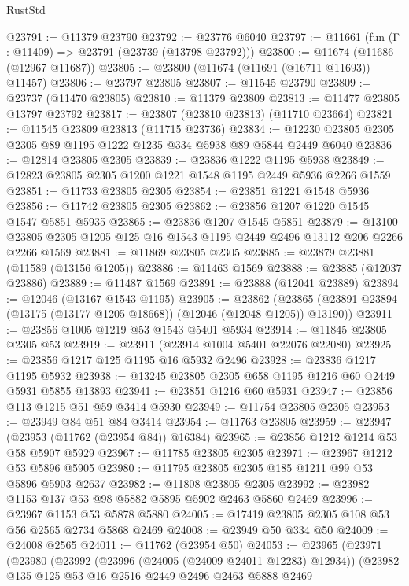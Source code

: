 \begin{lexlean}{RustStd}
\begin{coremodule}
@23791 := @11379 @23790
@23792 := @23776 @6040
@23797 := @11661 (fun (Γ : @11409) => @23791 (@23739 (@13798 @23792)))
@23800 := @11674 (@11686 (@12967 @11687))
@23805 := @23800 (@11674 (@11691 (@16711 @11693)) @11457)
@23806 := @23797 @23805
@23807 := @11545 @23790
@23809 := @23737 (@11470 @23805)
@23810 := @11379 @23809
@23813 := @11477 @23805 @13797 @23792
@23817 := @23807 (@23810 @23813) (@11710 @23664)
@23821 := @11545 @23809 @23813 (@11715 @23736)
@23834 := @12230 @23805 @2305 @2305 @89 @1195 @1222 @1235 @334 @5938 @89 @5844 @2449 @6040
@23836 := @12814 @23805 @2305
@23839 := @23836 @1222 @1195 @5938
@23849 := @12823 @23805 @2305 @1200 @1221 @1548 @1195 @2449 @5936 @2266 @1559
@23851 := @11733 @23805 @2305
@23854 := @23851 @1221 @1548 @5936
@23856 := @11742 @23805 @2305
@23862 := @23856 @1207 @1220 @1545 @1547 @5851 @5935
@23865 := @23836 @1207 @1545 @5851
@23879 := @13100 @23805 @2305 @1205 @125 @16 @1543 @1195 @2449 @2496 @13112 @206 @2266 @2266 @1569
@23881 := @11869 @23805 @2305
@23885 := @23879 @23881 (@11589 (@13156 @1205))
@23886 := @11463 @1569
@23888 := @23885 (@12037 @23886)
@23889 := @11487 @1569
@23891 := @23888 (@12041 @23889)
@23894 := @12046 (@13167 @1543 @1195)
@23905 := @23862
    (@23865 (@23891 @23894 (@13175 (@13177 @1205 @18668)) (@12046 (@12048 @1205)) @13190))
@23911 := @23856 @1005 @1219 @53 @1543 @5401 @5934
@23914 := @11845 @23805 @2305 @53
@23919 := @23911 (@23914 @1004 @5401 @22076 @22080)
@23925 := @23856 @1217 @125 @1195 @16 @5932 @2496
@23928 := @23836 @1217 @1195 @5932
@23938 := @13245 @23805 @2305 @658 @1195 @1216 @60 @2449 @5931 @5855 @13893
@23941 := @23851 @1216 @60 @5931
@23947 := @23856 @113 @1215 @51 @59 @3414 @5930
@23949 := @11754 @23805 @2305
@23953 := @23949 @84 @51 @84 @3414
@23954 := @11763 @23805
@23959 := @23947 (@23953 (@11762 (@23954 @84)) @16384)
@23965 := @23856 @1212 @1214 @53 @58 @5907 @5929
@23967 := @11785 @23805 @2305
@23971 := @23967 @1212 @53 @5896 @5905
@23980 := @11795 @23805 @2305 @185 @1211 @99 @53 @5896 @5903 @2637
@23982 := @11808 @23805 @2305
@23992 := @23982 @1153 @137 @53 @98 @5882 @5895 @5902 @2463 @5860 @2469
@23996 := @23967 @1153 @53 @5878 @5880
@24005 := @17419 @23805 @2305 @108 @53 @56 @2565 @2734 @5868 @2469
@24008 := @23949 @50 @334 @50
@24009 := @24008 @2565
@24011 := @11762 (@23954 @50)
@24053 := @23965
    (@23971
      (@23980
        (@23992
          (@23996 (@24005 (@24009 @24011 @12283) @12934))
          (@23982
            @135
            @125
            @53
            @16
            @2516
            @2449
            @2496
            @2463
            @5888
            @2469

\end{coremodule}
\end{lexlean}
